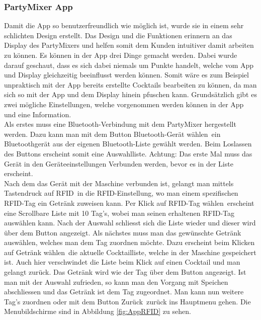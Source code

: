 \subsubsection{PartyMixer App}
\label{subsubsec:Software_PartyMixer_App}

Damit die App so benutzerfreundlich wie möglich ist, wurde sie in einem sehr schlichten Design erstellt. Das Design und die Funktionen erinnern an das Display des PartyMixers und helfen somit dem Kunden intuitiver damit arbeiten zu können. Es können in der App drei Dinge gemacht werden. Dabei wurde darauf geschaut, dass es sich dabei niemals um Punkte handelt, welche vom App und Display gleichzeitig beeinflusst werden können. Somit wäre es zum Beispiel unpraktisch mit der App bereits erstellte Cocktails bearbeiten zu können, da man sich so mit der App und dem Display hinein pfuschen kann. Grundsätzlich gibt es zwei mögliche Einstellungen, welche vorgenommen werden können in der App und eine Information. \\

Als erstes muss eine Bluetooth-Verbindung mit dem PartyMixer hergestellt werden. Dazu kann man mit dem Button \flqq Bluetooth-Gerät wählen\frqq~ein Bluetoothgerät aus der eigenen Bluetooth-Liste gewählt werden. Beim Loslassen des Buttons erscheint somit eine Auswahlliste. Achtung: Das erste Mal muss das Gerät in den Geräteeinstellungen Verbunden werden, bevor es in der Liste erscheint.\\

Nach dem das Gerät mit der Maschine verbunden ist, gelangt man mittels Tastendruck auf \flqq RFID\frqq~in die RFID-Einstellung, wo man einem spezifischen RFID-Tag ein Getränk zuweisen kann. Per Klick auf \flqq RFID-Tag wählen\frqq~erscheint eine Scrollbare Liste mit 10 Tag's, wobei man seinen erhaltenen RFID-Tag auswählen kann. Nach der Auswahl schliesst sich die Liste wieder und dieser wird über dem Button angezeigt. Als nächstes muss man das gewünschte Getränk auswählen, welches man dem Tag zuordnen möchte. Dazu erscheint beim Klicken auf \flqq Getränk wählen\frqq~die aktuelle Cocktailliste, welche in der Maschine gespeichert ist. Auch hier verschwindet die Liste beim Klick auf einen Cocktail und man gelangt zurück. Das Getränk wird wie der Tag über dem Button angezeigt. Ist man mit der Auswahl zufrieden, so kann man den Vorgang mit Speichen abschliessen und das Getränk ist dem Tag zugeordnet. Man kann nun weitere Tag's zuordnen oder mit dem Button \flqq Zurück\frqq~zurück ins Hauptmenu gehen.
Die Menubildschirme sind in Abbildung \ref{fig:AppRFID} zu sehen.\\

